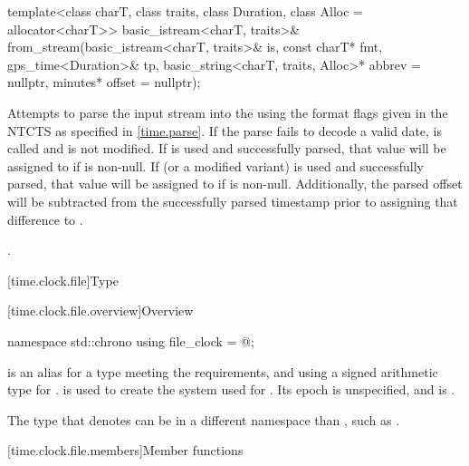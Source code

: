 %
\begin{itemdecl}
template<class charT, class traits, class Duration, class Alloc = allocator<charT>>
  basic_istream<charT, traits>&
    from_stream(basic_istream<charT, traits>& is, const charT* fmt,
                gps_time<Duration>& tp, basic_string<charT, traits, Alloc>* abbrev = nullptr,
                minutes* offset = nullptr);
\end{itemdecl}

\begin{itemdescr}
\pnum
\effects
Attempts to parse the input stream 
into the   using
the format flags given in the NTCTS 
as specified in \ref{time.parse}.
If the parse fails to decode a valid date,
 is called and
 is not modified.
If  is used and successfully parsed,
that value will be assigned to  if  is non-null.
If  (or a modified variant) is used and successfully parsed,
that value will be assigned to  if  is non-null.
Additionally, the parsed offset will be subtracted from
the successfully parsed timestamp prior to assigning that difference to .

\pnum
\returns
{}.
\end{itemdescr}

[time.clock.file]{Type }

[time.clock.file.overview]{Overview}
%

\begin{codeblock}
namespace std::chrono {
  using file_clock = @\seebelow@;
}
\end{codeblock}

\pnum
{} is an alias for a type
meeting the  requirements, and
using a signed arithmetic type for .
 is used to create the  system
used for .
Its epoch is unspecified, and
 is .
\begin{note}
The type that  denotes can be
in a different namespace than ,
such as .
\end{note}

[time.clock.file.members]{Member functions}

